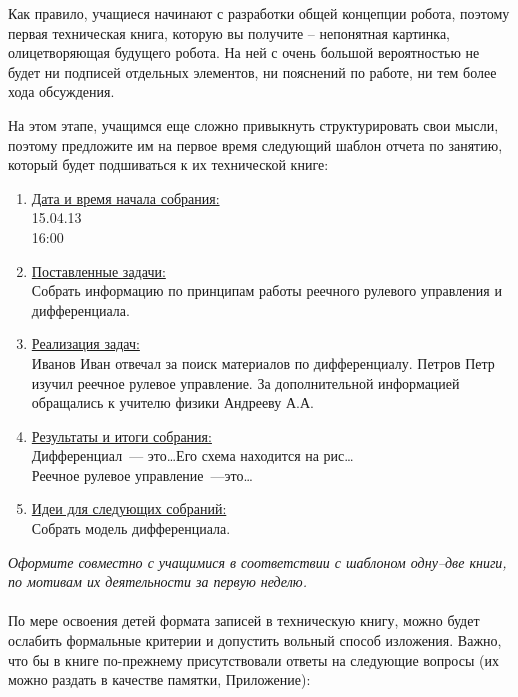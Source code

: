 Как правило, учащиеся начинают с разработки общей концепции робота, поэтому первая техническая книга, которую вы получите – непонятная картинка, олицетворяющая будущего робота. На ней с очень большой вероятностью не будет ни подписей отдельных элементов, ни пояснений по работе, ни тем более хода обсуждения.

На этом этапе, учащимся еще сложно привыкнуть структурировать свои мысли, поэтому  предложите им на первое время следующий шаблон отчета по занятию, который будет подшиваться к их технической книге:

\begin{enumerate}
	\item\underline{Дата и время начала собрания:}\\
	15.04.13\\
	16:00
	
	\item\underline{Поставленные задачи:}\\
	Собрать информацию по принципам работы реечного рулевого управления и дифференциала.
	
	\item\underline{Реализация задач:}\\ 
	Иванов Иван отвечал за поиск материалов по дифференциалу. Петров Петр изучил реечное рулевое управление.  За дополнительной информацией обращались к учителю физики Андрееву А.А.
	
	\item\underline{Результаты и итоги собрания:}\\
	Дифференциал~--- это\dots Его схема находится на рис\dots\\
	Реечное рулевое управление~---это\dots
	
	\item\underline{Идеи для следующих собраний:}\\
	Собрать модель дифференциала.
\end{enumerate}

{\slshape Оформите совместно с учащимися  в соответствии с шаблоном одну--две книги, по мотивам их деятельности за первую неделю.}\\\\

По мере освоения детей формата записей в техническую книгу, можно будет ослабить формальные критерии и допустить вольный способ изложения. Важно, что бы в книге по-прежнему присутствовали ответы на следующие вопросы (их можно раздать в качестве памятки, Приложение):

